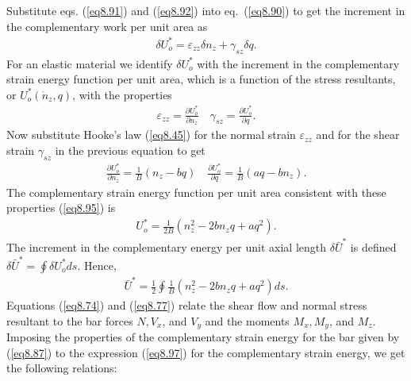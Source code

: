 \documentclass{AeroStructure-ERJohnson}
\begin{document}
Substitute eqs. (\ref{eq8.91}) and (\ref{eq8.92}) into
eq.~(\ref{eq8.90}) to get the increment in the complementary work
per unit area as
\begin{align}\label{eq8.93}
\delta U_{o}^{*}=\varepsilon_{z z} \delta n_{z}+\gamma_{s z}
\delta q.
\end{align}
For an elastic material we identify $\delta U_{o}^{*}$ with the
increment in the complementary strain energy function per unit
area, which is a function of the stress resultants, or
$U_{o}^{*}\left(\dot{n}_{z}, q\right)$, with the properties
\begin{align}\label{eq8.94}
\varepsilon_{z z}=\frac{\partial U_{o}^{*}}{\partial n_{z}} \quad
\gamma_{s z}=\frac{\partial U_{o}^{*}}{\partial q}.
\end{align}
Now substitute Hooke's law (\ref{eq8.45}) for the normal strain
$\varepsilon_{z z}$ and for the shear strain $\gamma_{s z}$ in the
previous equation to get
\begin{align}\label{eq8.95}
\frac{\partial U_{o}^{*}}{\partial n_{z}}=\frac{1}{B}\left(n_{z}-b
q\right) \quad \frac{\partial U_{o}^{*}}{\partial
q}=\frac{1}{B}\left(a q-b n_{z}\right).
\end{align}
The complementary strain energy function per unit area consistent
with these properties (\ref{eq8.95}) is
\begin{align}\label{eq8.96}
U_{o}^{*}=\frac{1}{2 B}(n_{z}^{2}-2 b n_{z} q+a q^{2}).
\end{align}
The increment in the complementary energy per unit axial length
$\delta \bar{U}^{*}$ is defined $\delta \bar{U}^{*}=\oint \delta
U_{o}^{*} d s$. Hence,
\begin{align}\label{eq8.97}
\bar{U}^{*}=\frac{1}{2} \oint \frac{1}{B}(n_{z}^{2}-2 b n_{z}
q+a q^{2}) d s.
\end{align}
Equations (\ref{eq8.74}) and (\ref{eq8.77}) relate the shear flow
and normal stress resultant to the bar forces $N, V_{x}$, and
$V_{y}$ and the moments $M_{x}, M_{y}$, and $M_{z}$. Imposing the
properties of the complementary strain energy for the bar given by
(\ref{eq8.87}) to the expression (\ref{eq8.97}) for the
complementary strain energy, we get the following relations:
\end{document}
